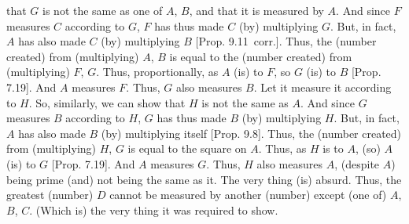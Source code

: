 \begin{Parallel}{}{}
{that $G$ is not the same as one of $A$, $B$, and that it is measured by $A$. 
And since $F$ measures $C$ according to $G$, $F$ has thus made
$C$ (by) multiplying $G$.  But, in fact, $A$ has
also made $C$ (by) multiplying $B$ [Prop. 9.11~corr.]. Thus, the (number created) from (multiplying)
$A$, $B$ is equal to  the (number created) from (multiplying) $F$, $G$.
Thus, proportionally, as $A$ (is) to $F$, so $G$ (is) to $B$ [Prop. 7.19]. And $A$ measures $F$. 
Thus, $G$ also measures $B$.
Let it measure
it according to $H$. So, similarly, we can show that $H$ is not the same as $A$. And since $G$ measures $B$ according to $H$, $G$ has thus made $B$
(by) multiplying $H$.  But, in fact, $A$ has
 also made $B$ (by) multiplying itself [Prop. 9.8]. Thus, the (number created) from (multiplying)
$H$, $G$ is equal to  the square on $A$. Thus, as $H$ is to $A$, (so) $A$ (is) to $G$ [Prop. 7.19]. And $A$ measures $G$.
Thus, $H$ also measures $A$, (despite $A$) being prime (and) not being  the same as it. The very thing (is) absurd. Thus, the greatest (number) $D$ cannot be
measured by  another (number) except (one of) $A$, $B$, $C$. (Which is) the
very thing it was required to show.}
\end{Parallel}

